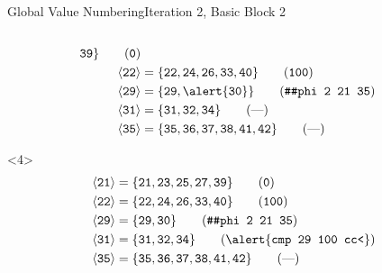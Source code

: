 \documentclass{beamer}
\newcommand{\vn}[1]{\ensuremath{\langle\texttt{#1}\rangle}}
\newcommand{\vreg}[1]{\texttt{#1}}
\begin{document}
\begin{frame}[fragile]{Global Value Numbering}{Iteration 2, Basic Block 2}
\begin{columns}[t,onlytextwidth]
\begin{column}{.5\textwidth}
\begin{onlyenv}
\begin{align*}
                       \vreg{39}\} \tag{\texttt{0}} \\
          \vn{22} &= \{\vreg{22},
                       \vreg{24},
                       \vreg{26},
                       \vreg{33},
                       \vreg{40}\} \tag{\texttt{100}} \\
          \vn{29} &= \{\vreg{29},
                       \alert{\vreg{30}}\} \tag{\texttt{\#\#phi 2 21 35}} \\
          \vn{31} &= \{\vreg{31},
                       \vreg{32},
                       \vreg{34}\} \tag{---} \\
          \vn{35} &= \{\vreg{35},
                       \vreg{36},
                       \vreg{37},
                       \vreg{38},
                       \vreg{41},
                       \vreg{42}\} \tag{---}
        \end{align*}
      \end{onlyenv}
      \begin{onlyenv}<4>
        \begin{align*}
          \vn{21} &= \{\vreg{21},
                       \vreg{23},
                       \vreg{25},
                       \vreg{27},
                       \vreg{39}\} \tag{\texttt{0}} \\
          \vn{22} &= \{\vreg{22},
                       \vreg{24},
                       \vreg{26},
                       \vreg{33},
                       \vreg{40}\} \tag{\texttt{100}} \\
          \vn{29} &= \{\vreg{29},
                       \vreg{30}\} \tag{\texttt{\#\#phi 2 21 35}} \\
          \vn{31} &= \{\vreg{31},
                       \vreg{32},
                       \vreg{34}\} \tag{\alert{\texttt{cmp 29 100 cc<}}} \\
          \vn{35} &= \{\vreg{35},
                       \vreg{36},
                       \vreg{37},
                       \vreg{38},
                       \vreg{41},
                       \vreg{42}\} \tag{---}
        \end{align*}
      \end{onlyenv}
    \end{column}
  \end{columns}
\end{frame}
\end{document}

